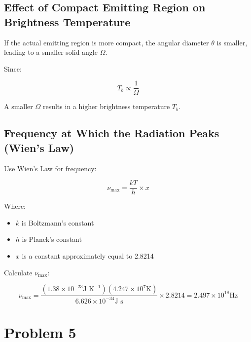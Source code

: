 \documentclass[12pt]{article}
\begin{document}
\subsection{Effect of Compact Emitting Region on Brightness Temperature}

If the actual emitting region is more compact, the angular diameter $\theta$ is smaller, leading to a smaller solid angle $\Omega$.

Since:

\[
    T_b \propto \dfrac{1}{\Omega}
\]

A smaller $\Omega$ results in a higher brightness temperature $T_b$.

\bigskip

\subsection{Frequency at Which the Radiation Peaks (Wien's Law)}

Use Wien's Law for frequency:

\[
    \nu_{\text{max}} = \dfrac{k T}{h} \times x
\]

Where:
\begin{itemize}
    \item $k$ is Boltzmann's constant
    \item $h$ is Planck's constant
    \item $x$ is a constant approximately equal to 2.8214
\end{itemize}

Calculate $\nu_{\text{max}}$:

\[
    \nu_{\text{max}} = \dfrac{(1.38 \times 10^{-23}\text{J K}^{-1})(4.247 \times 10^{7}\text{K})}{6.626 \times 10^{-34}\text{J s}} \times 2.8214 = 2.497 \times 10^{18}\text{Hz}
\]

\newpage

\section{Problem 5}
\end{document}
